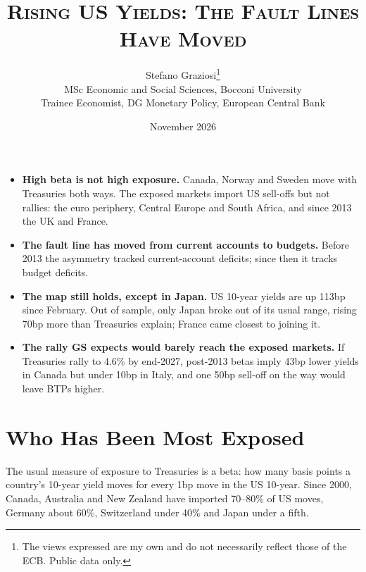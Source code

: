 \documentclass[11pt,a4paper]{article}
\newcommand{\kp}[1]{\textbf{\color{notenavy}#1}}
\newcommand{\notedate}{November 2026}
\begin{document}
\title{\textsc{Rising US Yields: The Fault Lines Have Moved}}
\author{Stefano Graziosi\thanks{The views expressed are my own and do not necessarily reflect those of the ECB. Public data only.}\\
  {\small MSc Economic and Social Sciences, Bocconi University}\\
  {\small Trainee Economist, DG Monetary Policy, European Central Bank}}
\date{\notedate}
\maketitle
\thispagestyle{first}

\begin{keypoints}
\begin{itemize}[label={\color{notenavy}\textbullet}, leftmargin=1em, itemsep=3pt, topsep=0pt, parsep=0pt]
  \item \kp{High beta is not high exposure.} Canada, Norway and Sweden move with Treasuries both ways. The exposed markets import US sell-offs but not rallies: the euro periphery, Central Europe and South Africa, and since 2013 the UK and France.
  \item \kp{The fault line has moved from current accounts to budgets.} Before 2013 the asymmetry tracked current-account deficits; since then it tracks budget deficits.
  \item \kp{The map still holds, except in Japan.} US 10-year yields are up 113bp since February. Out of sample, only Japan broke out of its usual range, rising 70bp more than Treasuries explain; France came closest to joining it.
  \item \kp{The rally GS expects would barely reach the exposed markets.} If Treasuries rally to 4.6\% by end-2027, post-2013 betas imply 43bp lower yields in Canada but under 10bp in Italy, and one 50bp sell-off on the way would leave BTPs higher.
\end{itemize}
\end{keypoints}

\section*{Who Has Been Most Exposed}
The usual measure of exposure to Treasuries is a beta: how many basis points a country's 10-year yield moves for every 1bp move in the US 10-year. Since 2000, Canada, Australia and New Zealand have imported 70--80\% of US moves, Germany about 60\%, Switzerland under 40\% and Japan under a fifth.
\end{document}
